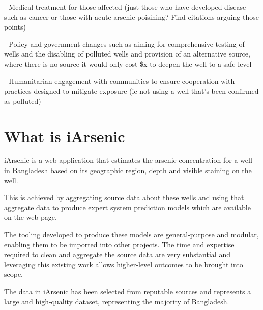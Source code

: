 - Medical treatment for those affected (just those who have developed disease such as cancer or those with acute arsenic poisining? Find citations arguing those points)

- Policy and government changes such as aiming for comprehensive testing of wells and the disabling of polluted wells and provision of an alternative source, where there is no source it would only cost \$x to deepen the well to a safe level

- Humanitarian engagement with communities to ensure cooperation with practices designed to mitigate exposure (ie not using a well that's been confirmed as polluted) 

\section{What is iArsenic}

iArsenic is a web application that estimates the arsenic concentration for a well in Bangladesh based on its geographic region, depth and visible staining on the well.

This is achieved by aggregating source data about these wells and using that aggregate data to produce expert system prediction models which are available on the web page.

The tooling developed to produce these models are general-purpose and modular, enabling them to be imported into other projects. The time and expertise required to clean and aggregate the source data are very substantial and leveraging this existing work allows higher-level outcomes to be brought into scope.

The data in iArsenic has been selected from reputable sources and represents a large and high-quality dataset, representing the majority of Bangladesh.